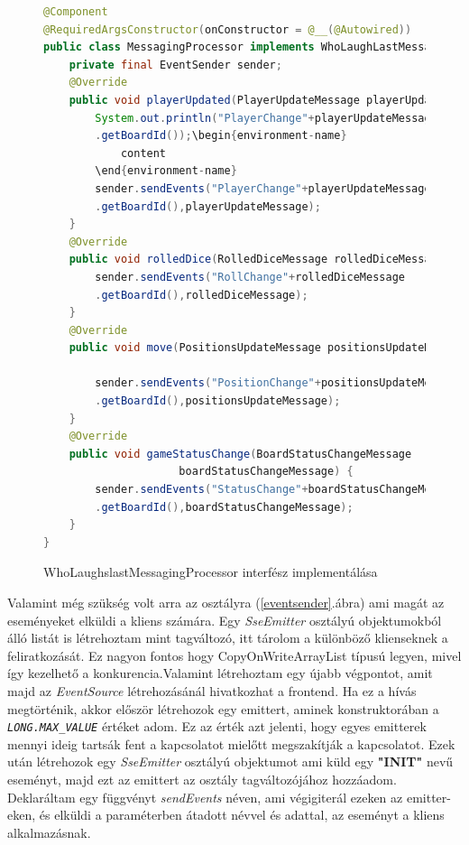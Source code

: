 \documentclass[a4paper,twoside]{article}
\begin{document}
\begin{figure}
	\caption{WhoLaughslastMessagingProcessor interfész implementálása}
	\begin{lstlisting}[language=java]	
@Component
@RequiredArgsConstructor(onConstructor = @__(@Autowired))
public class MessagingProcessor implements WhoLaughLastMessagingProcessor{
	private final EventSender sender;
	@Override
	public void playerUpdated(PlayerUpdateMessage playerUpdateMessage) {
		System.out.println("PlayerChange"+playerUpdateMessage
		.getBoardId());\begin{environment-name}
			content
		\end{environment-name}
		sender.sendEvents("PlayerChange"+playerUpdateMessage
		.getBoardId(),playerUpdateMessage);
	}
	@Override
	public void rolledDice(RolledDiceMessage rolledDiceMessage) {
		sender.sendEvents("RollChange"+rolledDiceMessage
		.getBoardId(),rolledDiceMessage);
	}
	@Override
	public void move(PositionsUpdateMessage positionsUpdateMessage) {
		
		sender.sendEvents("PositionChange"+positionsUpdateMessage
		.getBoardId(),positionsUpdateMessage);
	}
	@Override
	public void gameStatusChange(BoardStatusChangeMessage
					 boardStatusChangeMessage) {
		sender.sendEvents("StatusChange"+boardStatusChangeMessage
		.getBoardId(),boardStatusChangeMessage);
	}
}
		\end{lstlisting}
		\label{messproc}
	\end{figure} 
	\FloatBarrier
Valamint még szükség volt arra az osztályra (\ref{eventsender}.ábra) ami magát az eseményeket elküldi a kliens számára.  Egy \textit{SseEmitter} osztályú objektumokból álló listát is létrehoztam mint tagváltozó, itt tárolom a különböző klienseknek a feliratkozását. Ez nagyon fontos hogy CopyOnWriteArrayList típusú legyen, mivel így kezelhető a konkurencia.Valamint létrehoztam egy újabb végpontot, amit majd az \textit{EventSource} létrehozásánál hivatkozhat a frontend.  Ha ez a hívás megtörténik, akkor először létrehozok egy emittert, aminek konstruktorában a \textit{\texttt{LONG.MAX\_VALUE}} értéket adom. Ez az érték azt jelenti, hogy egyes emitterek mennyi ideig tartsák fent a kapcsolatot mielőtt megszakítják a kapcsolatot. Ezek után létrehozok egy \textit{SseEmitter} osztályú objektumot ami küld egy \textbf{"INIT"} nevű eseményt, majd ezt az emittert az osztály tagváltozójához hozzáadom. Deklaráltam egy függvényt \textit{sendEvents} néven, ami végigiterál ezeken az emitter-eken, és elküldi a paraméterben átadott névvel és adattal, az eseményt a kliens alkalmazásnak.   
\end{document}

